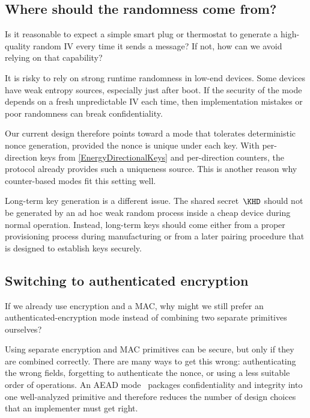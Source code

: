 \subsection{Where should the randomness come from?}

\begin{exercise}
  Is it reasonable to expect a simple smart plug or thermostat to generate a
  high-quality random IV every time it sends a message?
  If not, how can we avoid relying on that capability?
\end{exercise}

It is risky to rely on strong runtime randomness in low-end devices.
Some devices have weak entropy sources, especially just after boot.
If the security of the mode depends on a fresh unpredictable IV each time,
then implementation mistakes or poor randomness can break confidentiality.

Our current design therefore points toward a mode that tolerates deterministic
nonce generation, provided the nonce is unique under each key.
With per-direction keys from \cref{EnergyDirectionalKeys} and per-direction
counters, the protocol already provides such a uniqueness source.
This is another reason why counter-based modes fit this setting well.

Long-term key generation is a different issue.
The shared secret~\(\KHD\) should not be generated by an ad hoc weak random
process inside a cheap device during normal operation.
Instead, long-term keys should come either from a proper provisioning process
during manufacturing or from a later pairing procedure that is designed to
establish keys securely.

\subsection{Switching to authenticated encryption}

\begin{exercise}
  If we already use encryption and a MAC, why might we still prefer an
  authenticated-encryption mode instead of combining two separate
  primitives ourselves?
\end{exercise}

Using separate encryption and MAC primitives can be secure, but only if they
are combined correctly.
There are many ways to get this wrong: authenticating the wrong fields,
forgetting to authenticate the nonce, or using a less suitable order of
operations.
An \ac{AEAD} mode~\autocite{Rogaway2002aead} packages confidentiality and
integrity into one well-analyzed primitive and therefore reduces the number
of design choices that an implementer must get right.

